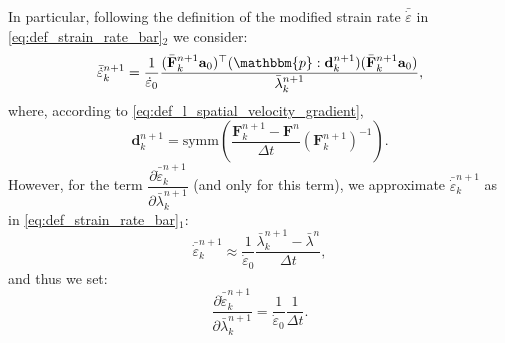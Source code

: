 \documentclass{sfuthesis}
\numberwithin{equation}{section}
\numberwithin{figure}{chapter}
\numberwithin{table}{chapter}
\theoremstyle{definition}
\def\*#1{{\mathbf{#1}}} %
\newcommand{\pder}[2]{\dfrac{\partial #1}{\partial #2}}
\newcommand{\depsilon}{\dot{\varepsilon}}
\newcommand{\T}{\top}
\newcommand{\p}{\mathbbm{p}}
\begin{document}
In particular, following the definition of the modified strain rate $\bar{\depsilon}$ in \eqref{eq:def_strain_rate_bar}$_2$ we consider:
\begin{equation} \label{eq:strain_rate_bar_newton_iteration}
    \bar{\depsilon}^{n+1}_k = \dfrac{1}{\depsilon_0} \dfrac{(\bar{\*F}_k^{n+1}\*a_0)^\T (\p : \*d^{n+1}_k) (\bar{\*F}_k^{n+1} \*a_0)}{\bar{\lambda}^{n+1}_k},
\end{equation}
where, according to \eqref{eq:def_l_spatial_velocity_gradient},
\begin{equation}
    \*d_k^{n+1} = \mathrm{symm} \left( \dfrac{\*F_k^{n+1} - \*F^n}{\Delta t} \left(\*F_k^{n+1}\right)^{-1} \right).
\end{equation}
However, for the term $\pder{\bar{\depsilon}^{n+1}_k}{\bar{\lambda}^{n+1}_k}$ (and only for this term), we approximate $\bar{\depsilon}^{n+1}_k$ as in \eqref{eq:def_strain_rate_bar}$_1$:
\begin{equation}
    \bar{\depsilon}^{n+1}_k \approx \dfrac{1}{\depsilon_0} \dfrac{\bar{\lambda}^{n+1}_k - \bar{\lambda}^n}{\Delta t},
\end{equation}
and thus we set:
\begin{equation} \label{eq:d_strain_rate_bar_d_lambda_bar}
    \pder{\bar{\depsilon}^{n+1}_k}{\bar{\lambda}^{n+1}_k} = \dfrac{1}{\depsilon_0} \dfrac{1}{\Delta t}.
\end{equation}
\end{document}
